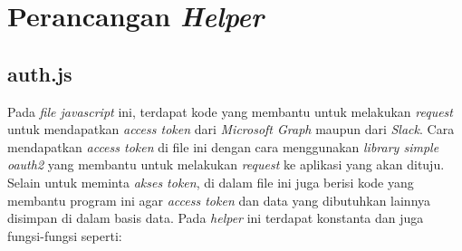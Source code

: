 \section{Perancangan \textit{Helper}}
\subsection{auth.js}
Pada \textit{file javascript} ini, terdapat kode yang membantu untuk melakukan \textit{request} untuk mendapatkan \textit{access token} dari \textit{Microsoft Graph} maupun dari \textit{Slack}. Cara mendapatkan \textit{access token} di file ini dengan cara menggunakan \textit{library simple oauth2} yang membantu untuk melakukan \textit{request} ke aplikasi yang akan dituju. Selain untuk meminta \textit{akses token}, di dalam file ini juga berisi kode yang membantu program ini agar \textit{access token} dan data yang dibutuhkan lainnya disimpan di dalam basis data. Pada \textit{helper} ini terdapat konstanta dan juga fungsi-fungsi seperti:
